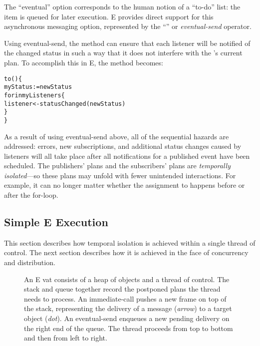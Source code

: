 \documentclass{llncs}
\begin{document}
The ``eventual'' option corresponds to the human notion of a ``to-do''
list: the item is queued for later execution. E provides direct
support for this asynchronous messaging option, represented by the
``\code{<-}'' or \emph{eventual-send} operator.

Using eventual-send, the  method can ensure that
each listener will be notified of the changed status in such a way
that it does not interfere with the 's current
plan.  To accomplish this in E, the  method becomes:
%
\begin{alltt}
    to () \{
        myStatus := newStatus
        for  in myListeners \{
            listener <- statusChanged(newStatus)
        \}
    \}
\end{alltt}
%
As a result of using eventual-send above, all of the sequential
hazards are addressed: errors, new subscriptions, and additional
status changes caused by listeners will all take place after all
notifications for a published event have been scheduled.  The
publishers' plans and the subscribers' plans are \emph{temporally
isolated}---so these plans may unfold with fewer unintended
interactions. For example, it can no longer matter whether the
assignment to  happens before or after the for-loop.

\subsection{Simple E Execution}

This section describes how temporal isolation is achieved within a
single thread of control.  The next section describes how it is
achieved in the face of concurrency and distribution.

\begin{figure}
\centerline{}
\caption{An E vat consists of a heap of objects and a thread of
  control. The stack and queue together record the postponed plans the
  thread needs to process. An immediate-call pushes a new frame on top
  of the stack, representing the delivery of a message ({\it arrow})
  to a target object ({\it dot}). An eventual-send enqueues a new
  pending delivery on the right end of the queue. The thread proceeds
  from top to bottom and then from left to right.
%
}
\label{fig:stackvat}
\end{figure}
\end{document}
